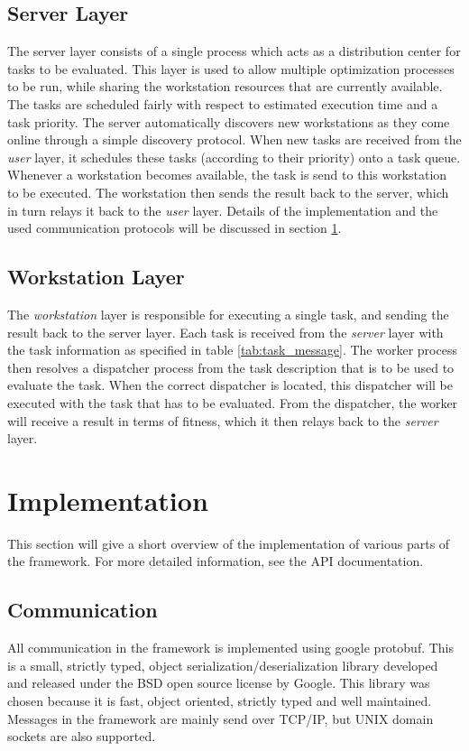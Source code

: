 \documentclass{article}
\begin{document}
\subsection{Server Layer}
The server layer consists of a single process which acts as a distribution
center for tasks to be evaluated. This layer is used to allow multiple 
optimization processes to be run, while sharing the workstation resources that
are currently available. The tasks are scheduled fairly with respect to estimated
execution time and a task priority. The server automatically discovers new
workstations as they come online through a simple discovery protocol. When
new tasks are received from the \textit{user} layer, it schedules these tasks
(according to their priority) onto a task queue. Whenever a workstation becomes
available, the task is send to this workstation to be executed. The workstation
then sends the result back to the server, which in turn relays it back to the
\textit{user} layer. Details of the implementation and the used communication
protocols will be discussed in section \ref{sec:implementation}.

\subsection{Workstation Layer}
The \textit{workstation} layer is responsible for executing a single task, and
sending the result back to the server layer. Each task is received from
the \textit{server} layer with the task information as specified in table
\ref{tab:task_message}. The worker process then resolves a dispatcher process
from the task description that is to be used to evaluate the task. When the
correct dispatcher is located, this dispatcher will be executed with 
the task that has to be evaluated. From the dispatcher, the worker will
receive a result in terms of fitness, which it then relays back to the
\textit{server} layer.

\section{Implementation}\label{sec:implementation}
This section will give a short overview of the implementation of various parts
of the framework. For more detailed information, see the API documentation.

\subsection{Communication}
All communication in the framework is implemented using google protobuf. This
is a small, strictly typed, object serialization/deserialization library
developed and released under the BSD open source license by Google. This library
was chosen because it is fast, object oriented, strictly typed and
well maintained. Messages in the framework are mainly send over TCP/IP, but 
UNIX domain sockets are also supported.
\end{document}
